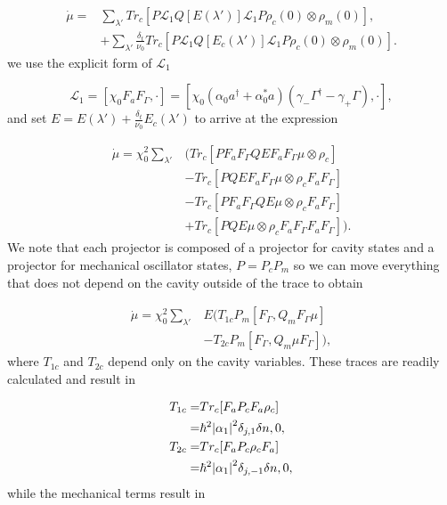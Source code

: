 \documentclass[reprint, amsmath,amssymb, aps,pra]{revtex4-1}
\begin{document}
\begin{align}
\dot{\mu}=&\sum_{\lambda'}Tr_c[P \mathcal{L}_1Q[E(\lambda')]\mathcal{L}_1P\rho_{c}(0)\otimes\rho_{m}(0) ],\\
&+\sum_{\lambda'}\frac{\delta_t}{\nu_0}Tr_c[P\mathcal{L}_1Q[E_c(\lambda')]\mathcal{L}_1P\rho_{c}(0)\otimes\rho_{m}(0) ]\nonumber.
\end{align} we use the explicit form of $\mathcal{L}_1$ 

\begin{equation}
\mathcal{L}_1 = [\chi_0 F_aF_\Gamma,\cdot] = [\chi_0(\alpha_0 a^\dagger + \alpha_0^* a)(\gamma_-\Gamma^\dagger-\gamma_+\Gamma),\cdot],
\end{equation}and set $E= E(\lambda') +\frac{\delta_t}{\nu_0} E_c(\lambda')$ to  arrive at the expression

\begin{align*}
\dot{\mu} = \chi_0^2 \sum_{\lambda'}&( Tr_c[PF_aF_\Gamma QEF_aF_\Gamma \mu \otimes \rho_{c}]\\
&- Tr_c[PQEF_aF_\Gamma\mu \otimes \rho_{c} F_aF_\Gamma ]\nonumber \\
&-Tr_c[PF_aF_\Gamma QE\mu \otimes \rho_{c} F_aF_\Gamma ] \nonumber\\ 
&+Tr_c[PQE\mu \otimes \rho_{c}F_aF_\Gamma  F_aF_\Gamma ]). \nonumber
\end{align*}  We note that each projector is composed of a projector for cavity states and a projector for mechanical oscillator states, $P=P_c P_m$ so we can move everything that does not depend on the cavity outside of the trace to obtain

\begin{align}
\dot{\mu}=\chi_0^2 \sum_{\lambda'}& E(T_{1c}P_m[F_\Gamma,Q_m F_\Gamma \mu]\\
&-T_{2c}P_m[F_\Gamma,Q_m \mu F_\Gamma ]),\nonumber
\end{align} where $T_{1c}$ and $T_{2c}$ depend only on the cavity variables. These traces are readily calculated and result in

\begin{align}
T_{1c}=& Tr_c[F_aP_cF_a\rho_c]\\
=&\hbar^2\abs{\alpha_1}^2 \delta_{j,1}\delta{n,0},\\
T_{2c}=& Tr_c[F_aP_c\rho_cF_a]\\
=&\hbar^2 \abs{\alpha_1}^2 \delta_{j,-1}\delta{n,0},\\
\end{align} while the mechanical terms result in
\end{document}
